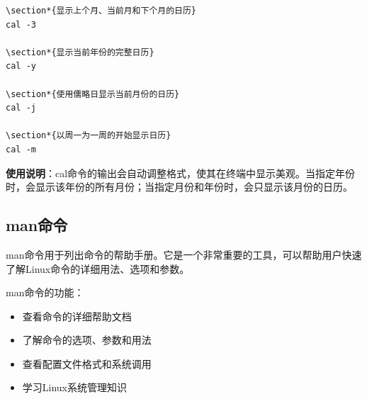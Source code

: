 \documentclass[12pt,UTF8]{ctexbook}
\begin{document}
\begin{verbatim}
\section*{显示上个月、当前月和下个月的日历}
cal -3

\section*{显示当前年份的完整日历}
cal -y

\section*{使用儒略日显示当前月份的日历}
cal -j

\section*{以周一为一周的开始显示日历}
cal -m
\end{verbatim}

\textbf{使用说明}：cal命令的输出会自动调整格式，使其在终端中显示美观。当指定年份时，会显示该年份的所有月份；当指定月份和年份时，会只显示该月份的日历。

\subsection{man命令}
man命令用于列出命令的帮助手册。它是一个非常重要的工具，可以帮助用户快速了解Linux命令的详细用法、选项和参数。

man命令的功能：
\begin{itemize}
    \item 查看命令的详细帮助文档
    \item 了解命令的选项、参数和用法
    \item 查看配置文件格式和系统调用
    \item 学习Linux系统管理知识
\end{itemize}
\end{document}
